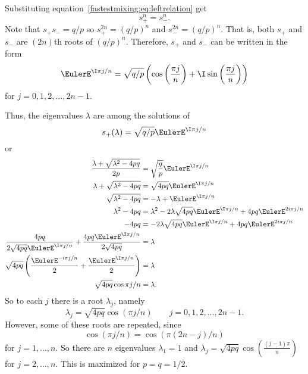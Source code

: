\documentclass[12pt]{article}
\begin{document}
\begin{solution}
    Substituting equation~\eqref{fastestmixing:eq:leftrelation} get
    \[
        s_{+}^n = s_{-}^n.
    \] Note that \( s_{+}s_{-} =q/p \) so \( s_{+}^{2n} = (q/p)^n \) and
    \( s_{-}^{2n} = (q/p)^n \).  That is, both \( s_{+} \) and \( s_{-} \)
    are \( (2n) \)th roots of \( (q/p)^n \).  Therefore, \( s_{+} \) and
    \( s_{-} \) can be written in the form
    \[
        \EulerE^{\I \pi j/n} = \sqrt{q/p} \left( \cos\left( \frac{ \pi j}
        {n} \right) + \I \sin\left( \frac{\pi j}{n} \right) \right)
    \] for \( j = 0, 1, 2, \dots, 2n-1 \).

    Thus, the eigenvalues \( \lambda \) are among the solutions of
    \[
        s_{+}(\lambda) = \sqrt{q/p} \EulerE^{\I \pi j/n}
    \] or
    \begin{align*}
        \frac{\lambda + \sqrt{\lambda^2 - 4pq}}{2p} &= \sqrt{\frac{q}{p}}\EulerE^
        {\I \pi j/n} \\
        \lambda + \sqrt{\lambda^2 - 4pq} &= \sqrt{4pq}\EulerE^{\I \pi
        j/n} \\
        \sqrt{\lambda^2 - 4pq} &= -\lambda + \EulerE^{\I \pi j/n} \\
        \lambda^2 - 4pq &= \lambda^2 - 2\lambda \sqrt{4pq} \EulerE^{\I
        \pi j/n} + 4pq \EulerE^{2 i \pi j/n} \\
        -4pq &= - 2\lambda \sqrt{4pq} \EulerE^{\I \pi j/n} + 4pq \EulerE^
        {2 i \pi j/n} \\
        \frac{4pq}{ 2 \sqrt{4pq} \EulerE^{\I \pi j/n} } + \frac{4pq
        \EulerE^{\I \pi j/n}}{2 \sqrt{4pq}} &= \lambda \\
        \sqrt{4pq} \left( \frac{\EulerE^{-i \pi j/n} }{2} + \frac{\EulerE^
        {\I \pi j/n}}{2} \right) &= \lambda \\
        \sqrt{4pq} \cos{\pi j/n } &= \lambda.  \\
    \end{align*}
    So to each \( j \) there is a root \( \lambda_j \), namely
    \[
        \lambda_j = \sqrt{4pq} \cos( \pi j/n ) \qquad j = 0,1,2, \dots,
        2n-1.
    \] However, some of these roots are repeated, since
    \[
        \cos( \pi j/n ) = \cos( \pi (2n-j)/n )
    \] for \( j = 1, \dots, n \).  So there are \( n \) eigenvalues \(
    \lambda_1 = 1 \) and \( \lambda_j = \sqrt{4pq} \cos\left( \frac{(j-1)
    \pi}{n} \right) \) for \( j=2, \dots, n \).  This is maximized for \(
    p = q = 1/2 \).
\end{solution}
\end{document}

